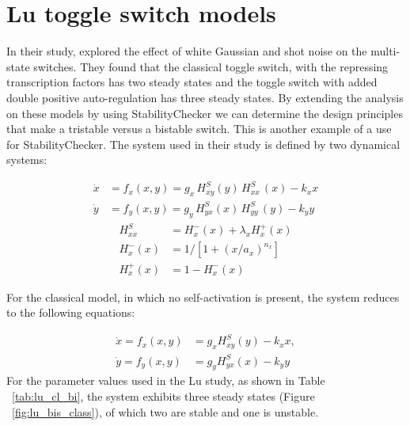 \newpage
\section{Lu toggle switch models}

In their study, \textcite{Lu:2013br} explored the effect of white Gaussian and shot noise on the multi-state switches. They found that the classical toggle switch, with the repressing transcription factors has two steady states and the toggle switch with added double positive auto-regulation has three steady states. By extending the analysis on these models by using StabilityChecker we can determine the design principles that make a tristable versus a bistable switch. This is another example of a use for StabilityChecker.
The system used in their study is defined by two dynamical systems:

\begin{align}
\dot{x} &= f_{x}(x,y) =g_{x}\, H^{S}_{xy}(y)\, H^{S}_{xx}\,(x)-k_{x}x \label{eq:lu_both_1} \\
\dot{y} &= f_{y}(x,y) =g_{y}\,H^{S}_{yx}(x)\,H^{S}_{yy}\,(y)-k_{y}y \label{eq:lu_both_2}
\end{align}
\begin{align}
H^{S}_{xx} &= H^{-}_{x}(x)+\lambda_{x}H^{+}_{x}(x)\label{eq:lu_hsxx}\\
H^{-}_{x}(x) &= 1 \big/\left[1+(x/a_{x})^{n_{x}}\right]\label{eq:lu_hpx}\\
H^{+}_{x}(x) &= 1-H^{-}_{x}(x)\label{eq:lu_hmx}
\end{align}

For the classical model, in which no self-activation is present, the system reduces to the following equations:

\begin{align}
\dot{x}=f_{x}(x,y) &= g_{x}H^{S}_{xy}(y)-k_{x}x,\label{eq:lu_cl_1}\\
\dot{y}=f_{y}(x,y) &= g_{y}H^{S}_{yx}(x)-k_{y}y\label{eq:lu_cl_2}
\end{align}
For the parameter values used in the Lu study, as shown in Table ~\ref{tab:lu_cl_bi}, the system exhibits three steady states (Figure ~\ref{fig:lu_bis_class}), of which two are stable and one is unstable. 

